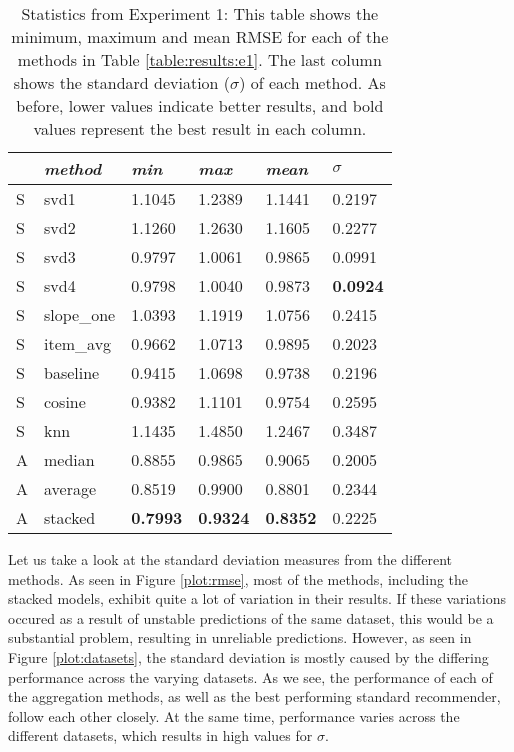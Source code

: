 \begin{table}[t]
  \begin{tabular*}{\textwidth}{ l p{3cm} p{2cm} p{2cm} p{2cm} p{2cm} }
    \toprule
      ~ & \emph{method} & 
      \emph{min} & \emph{max} & \emph{mean} & $\sigma$\\
    \midrule
    S & svd1          & 1.1045	& 1.2389	& 1.1441	& 0.2197 \\
    S & svd2          & 1.1260	& 1.2630	& 1.1605	& 0.2277 \\
    S & svd3          & 0.9797	& 1.0061	& 0.9865	& 0.0991 \\
    S & svd4          & 0.9798	& 1.0040	& 0.9873	& \textbf{0.0924} \\
    S & slope\_one    & 1.0393	& 1.1919	& 1.0756	& 0.2415 \\
    S & item\_avg     & 0.9662	& 1.0713	& 0.9895	& 0.2023 \\
    S & baseline       & 0.9415	& 1.0698	& 0.9738	& 0.2196 \\
    S & cosine   	    & 0.9382	& 1.1101	& 0.9754	& 0.2595 \\
    S & knn       	  & 1.1435	& 1.4850	& 1.2467	& 0.3487 \\
    \midrule            
    A & median    	  & 0.8855	& 0.9865	& 0.9065	& 0.2005 \\
    A & average    	  & 0.8519	& 0.9900	& 0.8801	& 0.2344 \\
    A & stacked       & \textbf{0.7993}	& \textbf{0.9324}	& \textbf{0.8352}	& 0.2225 \\
    \bottomrule
  \end{tabular*}
  \caption[Statistics from Experiment 1]{
      Statistics from Experiment 1: 
      This table shows the minimum, maximum and mean RMSE for each of the methods in Table \ref{table:results:e1}.
      The last column shows the standard deviation ($\sigma$) of each method.
      As before, lower values indicate better results, and bold values
      represent the best result in each column.
    }
  \label{table:results:e1:sum}
\end{table}





Let us take a look at the standard deviation measures from the different methods.
As seen in Figure \ref{plot:rmse}, 
most of the methods, including the stacked models,
exhibit quite a lot of variation in their results.
If these variations occured as a result of unstable
predictions of the same dataset, this would be a substantial problem,
resulting in unreliable predictions.
However, as seen in Figure \ref{plot:datasets},
the standard deviation is mostly caused by the differing
performance across the varying datasets.
As we see, the performance of each of the aggregation methods,
as well as the best performing standard recommender,
follow each other closely. At the same time,
performance varies across the different datasets,
which results in high values for $\sigma$.

